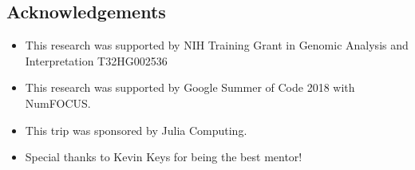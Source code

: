 \documentclass[a0,portrait]{a0poster}
\begin{document}
\begin{multicols}{2}
\section*{Acknowledgements}
\color{Black}
\begin{itemize}
\item This research was supported by NIH Training Grant in Genomic Analysis and Interpretation T32HG002536
\item This research was supported by Google Summer of Code 2018 with NumFOCUS.
\item This trip was sponsored by Julia Computing.
\item Special thanks to Kevin Keys for being the best mentor!\end{itemize}

\end{multicols}
\end{document}
